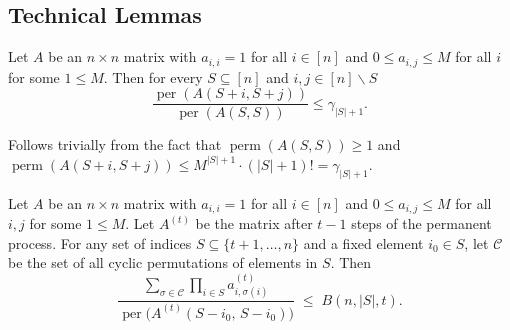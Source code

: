\documentclass[11pt]{article}
\makeatletter
\theoremstyle{definition}
\newenvironment{proof}[1][\protect\proofname]{\par
	\normalfont\topsep6\p@\@plus6\p@\relax
	\trivlist
	\itemindent\parindent        %
	\item[\hskip\labelsep\scshape #1]\ignorespaces
}{%
	\endtrivlist\@endpefalse
}
\providecommand{\proofname}{Proof}
\DeclareMathOperator{\per}{per}
\DeclareMathOperator{\perm}{perm}
\newcommand{\del}{\backslash}
\makeatother
\begin{document}
\subsection{Technical Lemmas}
\begin{observation} 
\label{obs:perm_ratio_bound}
Let $A$ be an $n \times n$ matrix with $a_{i,i} = 1$ for all $i \in [n]$ and $0\leq a_{i,j} \le M$ for all $i$ for some $1\leq M$. Then for every $ S\subseteq [n]$ and $i,j \in [n]\del S$
\begin{equation*}
    \frac{\per(A(S+i, S+j))}{\per(A(S,S))} \le \gamma_{|S|+1}.
\end{equation*}
\end{observation} 
\begin{proof}
Follows trivially from the fact that $\perm(A(S,S))\geq 1$ and $\perm(A(S+i, S+j))\leq M^{|S|+1}\cdot (|S|+1)!=\gamma_{|S|+1}$. 
\end{proof}




\begin{lemma}\label{lem:cycles_bound}
Let $A$ be an $n \times n$ matrix with $a_{i,i} = 1$ for all $i \in [n]$ and $0\leq a_{i,j} \le M$ for all $i,j$ for some $1\leq M$. Let $A^{(t)}$ be the matrix after $t-1$ steps of the permanent process. For any set of indices $S \subseteq \{t+1, \dots, n\}$ and a fixed element $i_0 \in S$, let $\mathcal{C}$ be the set of all cyclic permutations of elements in $S$. Then
\begin{equation*}
     \frac{\displaystyle \sum_{\sigma \in \mathcal{C}} \prod_{i \in S} a^{(t)}_{i,\sigma(i)}}
       {\per\!\big(A^{(t)}(S - i_0 ,\,S - i_0)\big)}
  \;\leq\; B(n,|S|,t).
\end{equation*}
\end{lemma}
\end{document}

